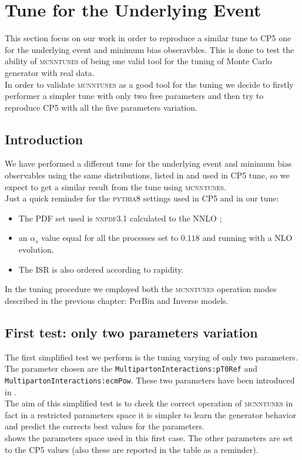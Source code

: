 \chapter{Tune for the Underlying Event}
\label{chap:OurTunefortheUnderlyingEvent}

This section focus on our work in order to reproduce a similar tune to CP5 one for the underlying event and minimum bias obseravbles. This is done to test the ability of \textsc{mcnntunes} of being one valid tool for the tuning of Monte Carlo generator with real data. 
\\
In order to validate \textsc{mcnntunes} as a good tool for the tuning we decide to firstly performer a simpler tune with only two free parameters and then try to reproduce CP5 \cite{CPtunes} with all the five parameters variation.


\section{Introduction}

We have performed a different tune for the underlying event and minimum bias observables using the same distributions, listed in  and used in CP5 tune, so we expect to get a similar result from the tune using  \textsc{mcnntunes}.
\\
Just a quick reminder for the \textsc{pythia8} settings used in CP5 and in our tune:
\begin{itemize}
	\item The PDF set used is \textsc{nnpdf}3.1 calculated to the NNLO \cite{NNPDF:2017mvq}; 
	\item an $\alpha_s$ value equal for all the processes set to $0.118$ and running with a NLO evolution.
	\item The ISR is also ordered according to rapidity.
\end{itemize}
In the tuning procedure we employed both the \textsc{mcnntunes} operation modes described in the previous chapter: PerBin and Inverse models.

\section{First test: only two parameters variation}

The first simplified test we perform is the tuning varying of only two parameters. The parameter chosen are the \texttt{Multiparton}\-\texttt{Interactions:}\-\texttt{pT0Ref} and 
\texttt{Multiparton}\-\texttt{Interactions:}\-\texttt{ecmPow}. These two parameters have been introduced in .
\\
The aim of this simplified test is to check the correct operation of \textsc{mcnntunes} in fact in a restricted parameters space it is simpler to learn the generator behavior and predict the corrects best values for the parameters. 
\\
 shows the parameters space used in this first case. The other parameters are set to the CP5 values (also these are reported in the table as a reminder).

